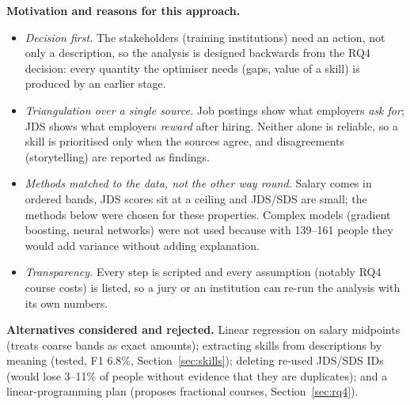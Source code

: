 \textbf{Motivation and reasons for this approach.}
\begin{itemize}
  \item \emph{Decision first.} The stakeholders (training institutions) need an action, not only
        a description, so the analysis is designed backwards from the RQ4 decision: every
        quantity the optimiser needs (gaps, value of a skill) is produced by an earlier stage.
  \item \emph{Triangulation over a single source.} Job postings show what employers \emph{ask
        for}; JDS shows what employers \emph{reward} after hiring. Neither alone is reliable, so a
        skill is prioritised only when the sources agree, and disagreements (storytelling) are
        reported as findings.
  \item \emph{Methods matched to the data, not the other way round.} Salary comes in ordered bands,
        JDS scores sit at a ceiling and JDS/SDS are small; the methods below were chosen for these
        properties. Complex models (gradient boosting, neural networks) were not used because with
        139--161 people they would add variance without adding explanation.
  \item \emph{Transparency.} Every step is scripted and every assumption (notably RQ4 course
        costs) is listed, so a jury or an institution can re-run the analysis with its own numbers.
\end{itemize}

\textbf{Alternatives considered and rejected.} Linear regression on salary midpoints (treats
coarse bands as exact amounts); extracting skills from descriptions by meaning (tested, F1 6.8\%,
Section~\ref{sec:skills}); deleting re-used JDS/SDS IDs (would lose 3--11\% of people without
evidence that they are duplicates); and a linear-programming plan (proposes fractional courses,
Section~\ref{sec:rq4}).


